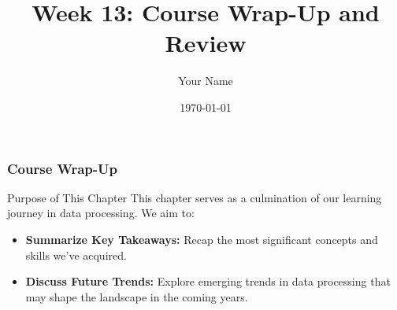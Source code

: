 \documentclass{beamer}
\title{Week 13: Course Wrap-Up and Review}
\author{Your Name}
\institute{Your Institution}
\date{\today}
\begin{document}
\frame{\titlepage}

\begin{frame}[fragile]
    \frametitle{Course Wrap-Up}
    
    \begin{block}{Purpose of This Chapter}
        This chapter serves as a culmination of our learning journey in data processing. We aim to:
    \end{block}
    
    \begin{itemize}
        \item \textbf{Summarize Key Takeaways:} Recap the most significant concepts and skills we've acquired.
        \item \textbf{Discuss Future Trends:} Explore emerging trends in data processing that may shape the landscape in the coming years.
    \end{itemize}
\end{frame}
\end{document}
